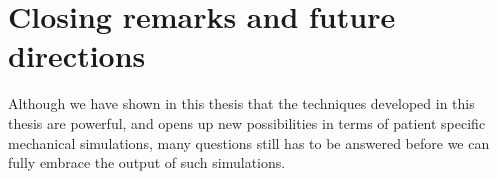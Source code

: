 \newpage


\section{Closing remarks and future directions}

Although we have shown in this thesis that the techniques developed in
this thesis are powerful, and opens up new possibilities in terms of
patient specific mechanical simulations, many questions still has to
be answered before we can fully embrace the output of such simulations.

